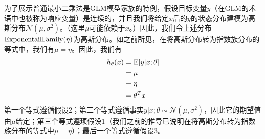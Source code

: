 为了展示普通最小二乘法是GLM模型家族的特例，假设目标变量$y$（在GLM的术语中也被称为响应变量）是连续的，并且我们将给定$x$后的$y$的状态分布建模为高斯分布$\mathcal{N}(\mu,\sigma^2)$。（这里$\mu$可能依赖于$x$。）因此，我们令上述分布${\rm ExponentailFamily}(\eta)$为高斯分布。如之前所见，在将高斯分布转为指数族分布的等式中，我们有$\mu=\eta$。因此，我们有
\begin{equation}
  \begin{aligned}
    h_\theta(x) & = {\rm E}[y|x;\theta] \\
                & = \mu                 \\
                & = \eta                \\
                & = \theta^T x
  \end{aligned}
\end{equation}
第一个等式遵循假设2；第二个等式遵循事实$y|x;\theta \sim \mathcal{N}(\mu,\sigma^2)$，因此它的期望值由$\mu$给定；第三个等式遵顼假设1（我们之前的推导已说明在将高斯分布转为指数族分布的等式中$\mu=\eta$）；最后一个等式遵循假设3。